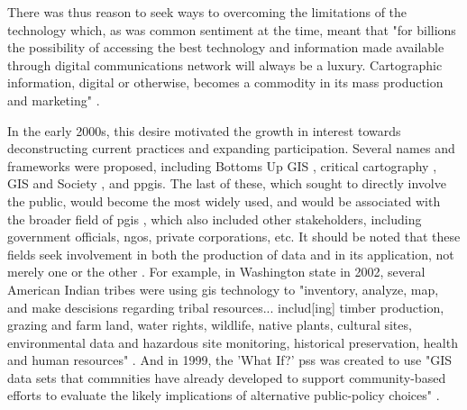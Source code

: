 \documentclass[notitlepage]{article}
\begin{document}
There was thus reason to seek ways to overcoming the limitations of the technology which, as was common sentiment at the time, meant that "for billions the possibility of accessing the best technology and information made available through digital communications network will always be a luxury. Cartographic information, digital or otherwise, becomes a commodity in its mass production and marketing" \cite{mchaffieManufacturingMetaphors1994}. 

In the early 2000s, this desire motivated the growth in interest towards deconstructing current practices and expanding participation. Several names and frameworks were proposed, including Bottoms Up GIS \cite{talenBottomUpGIS2000}, critical cartography \cite{cramptonIntroductionCriticalCartography2005, kimCriticalCartographyParticipatory2015}, GIS and Society \cite{sieberPublicParticipationGeographic2006}, and \ac{ppgis}. The last of these, which sought to directly involve the public, would become the most widely used, and would be associated with the broader field of \ac{pgis} \cite{sieberPublicParticipationGeographic2006}, which also included other stakeholders, including government officials, \acp{ngo}, private corporations, etc. It should be noted that these fields seek involvement in both the production of data and in its application, not merely one or the other \cite{weinerParticipatoryGeographicInformation2007, talenBottomUpGIS2000}. For example, in Washington state in 2002, several American Indian tribes were using \ac{gis} technology to "inventory, analyze, map, and make descisions regarding tribal resources... includ[ing] timber production, grazing and farm land, water rights, wildlife, native plants, cultural sites, environmental data and hazardous site monitoring, historical preservation, health and human resources" \cite{bondCherokeeNationTribal2002}. And in 1999, the 'What If?' \ac{pss} was created to use "GIS data sets that commnities have already developed to support community-based efforts to evaluate the likely implications of alternative public-policy choices" \cite{klostermanWhatIfCollaborative1999}. 

\end{document}
